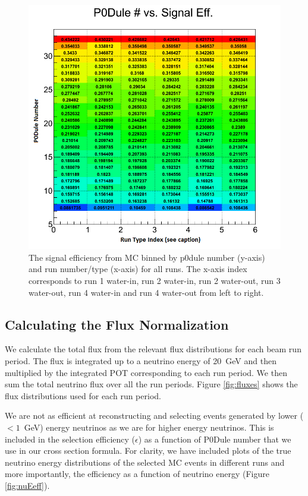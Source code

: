 \clearpage

\begin{figure}[h]
\centering
\includegraphics[width=6in]{Figures/TN100Plots/cEff_RvZ.png}
\caption{The signal efficiency from MC binned by p0dule number (y-axis) and run number/type (x-axis) for all runs. The x-axis index corresponds to run 1 water-in, run 2 water-in, run 2 water-out, run 3 water-out, run 4 water-in and run 4 water-out from left to right.}
\label{fig:xseffvZ}
\end{figure}

\clearpage

\subsection{Calculating the Flux Normalization}

We calculate the total flux from the relevant flux distributions for each beam run period. The flux is integrated up to a neutrino energy of 20~GeV and then multiplied by the integrated POT corresponding to each run period. We then sum the total neutrino flux over all the run periods. Figure \ref{fig:fluxes} shows the flux distributions used for each run period.

We are not as efficient at reconstructing and selecting events generated by lower ($<1$~GeV) energy neutrinos as we are for higher energy neutrinos. This is included in the selection efficiency ($\epsilon$) as a function of P0Dule number that we use in our cross section formula. For clarity, we have included plots of the true neutrino energy distributions of the selected MC events in different runs and more importantly, the efficiency as a function of neutrino energy (Figure \ref{fig:nuEeff}).

